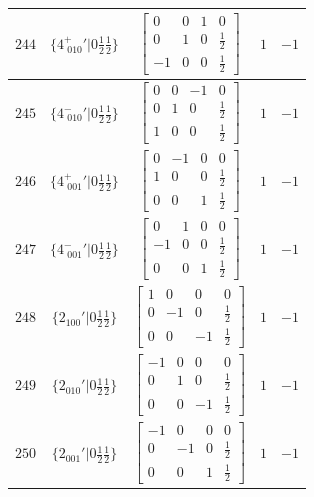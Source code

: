 \documentclass[fleqn,8pt]{jsarticle}
\begin{document}
\begin{longtable}{ccccc}
$ 244 $ & $ \{4^{+}_{\,\,010}{}'|0 \frac{1}{2} \frac{1}{2}\} $ & $ \begin{bmatrix} 0 & 0 & 1 & 0 \\ 0 & 1 & 0 & \frac{1}{2} \\ -1 & 0 & 0 & \frac{1}{2} \end{bmatrix} $ & $ 1 $ & $ -1 $ \\ \hline
$ 245 $ & $ \{4^{-}_{\,\,010}{}'|0 \frac{1}{2} \frac{1}{2}\} $ & $ \begin{bmatrix} 0 & 0 & -1 & 0 \\ 0 & 1 & 0 & \frac{1}{2} \\ 1 & 0 & 0 & \frac{1}{2} \end{bmatrix} $ & $ 1 $ & $ -1 $ \\ \hline
$ 246 $ & $ \{4^{+}_{\,\,001}{}'|0 \frac{1}{2} \frac{1}{2}\} $ & $ \begin{bmatrix} 0 & -1 & 0 & 0 \\ 1 & 0 & 0 & \frac{1}{2} \\ 0 & 0 & 1 & \frac{1}{2} \end{bmatrix} $ & $ 1 $ & $ -1 $ \\ \hline
$ 247 $ & $ \{4^{-}_{\,\,001}{}'|0 \frac{1}{2} \frac{1}{2}\} $ & $ \begin{bmatrix} 0 & 1 & 0 & 0 \\ -1 & 0 & 0 & \frac{1}{2} \\ 0 & 0 & 1 & \frac{1}{2} \end{bmatrix} $ & $ 1 $ & $ -1 $ \\ \hline
$ 248 $ & $ \{2{}_{100}{}'|0 \frac{1}{2} \frac{1}{2}\} $ & $ \begin{bmatrix} 1 & 0 & 0 & 0 \\ 0 & -1 & 0 & \frac{1}{2} \\ 0 & 0 & -1 & \frac{1}{2} \end{bmatrix} $ & $ 1 $ & $ -1 $ \\ \hline
$ 249 $ & $ \{2{}_{010}{}'|0 \frac{1}{2} \frac{1}{2}\} $ & $ \begin{bmatrix} -1 & 0 & 0 & 0 \\ 0 & 1 & 0 & \frac{1}{2} \\ 0 & 0 & -1 & \frac{1}{2} \end{bmatrix} $ & $ 1 $ & $ -1 $ \\ \hline
$ 250 $ & $ \{2{}_{001}{}'|0 \frac{1}{2} \frac{1}{2}\} $ & $ \begin{bmatrix} -1 & 0 & 0 & 0 \\ 0 & -1 & 0 & \frac{1}{2} \\ 0 & 0 & 1 & \frac{1}{2} \end{bmatrix} $ & $ 1 $ & $ -1 $ \\ \hline

\end{longtable}
\end{document}
